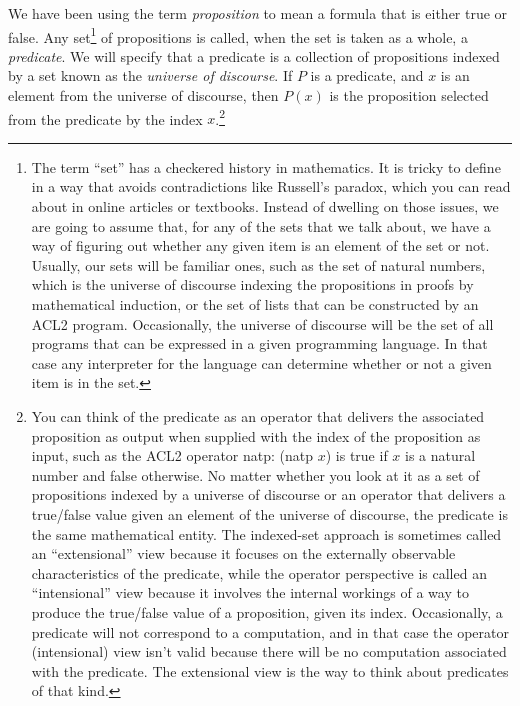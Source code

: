 {{\label{proposition-def}
We have been using the term \emph{proposition}
to mean a formula that is either true or false.
Any set\footnote{The
term
``set'' has a checkered history in mathematics.
It is tricky to define in a way that avoids contradictions
like Russell's paradox, which you can read about
in online articles or textbooks.
Instead of dwelling on those issues,
we are going to assume that,
for any of the sets that we talk about,
we have a way of figuring out whether any given
item is an element of the set or not.
Usually, our sets will be familiar ones,
such as the set of natural numbers, which
is the universe of discourse indexing the propositions
in proofs by mathematical induction, or
the set of lists that can be constructed
by an ACL2 program.
Occasionally, the universe of discourse will be
the set of all programs that can be expressed in a given
programming language.
In that case
any interpreter for the language
can determine whether or
not a given item is in the set.}
of propositions is called,
when the set is taken as a whole, a
\label{predicate-def}\emph{predicate}.
We will specify that a predicate
is a collection of propositions
indexed by a set known as the
\label{def-universe-of-discourse}\emph{universe of discourse}.
If $P$ is a predicate, and $x$ is an element from
the universe of discourse, then $P(x)$ is
the proposition
selected from the predicate by the index $x$.\footnote{You
can think of the predicate as an
operator that delivers the associated proposition as output
when supplied with the index of the proposition as input,
such as the ACL2 operator natp: (natp $x$) is true if
$x$ is a natural number and false otherwise.
No matter whether you look at it as a set of propositions
indexed by a universe of discourse or an operator that
delivers a true/false value given an element of the universe of discourse,
the predicate is the same mathematical entity.
The indexed-set approach is sometimes called an ``extensional'' view
because it focuses on the externally observable characteristics of the predicate,
while the operator perspective is called an ``intensional'' view
because it involves the internal workings of a way to produce the true/false value
of a proposition, given its index.
Occasionally, a predicate will not correspond to a computation,
and in that case the operator (intensional) view
isn't valid because there will be no
computation associated with the predicate.
The extensional view is the way
to think about predicates of that kind.}

}}
